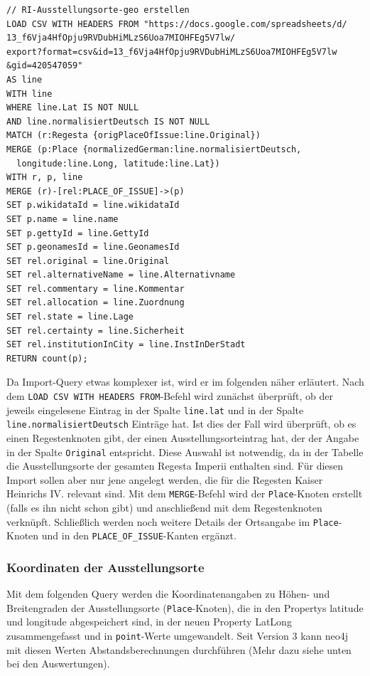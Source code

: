\begin{verbatim}
// RI-Ausstellungsorte-geo erstellen
LOAD CSV WITH HEADERS FROM "https://docs.google.com/spreadsheets/d/
13_f6Vja4HfOpju9RVDubHiMLzS6Uoa7MIOHFEg5V7lw/
export?format=csv&id=13_f6Vja4HfOpju9RVDubHiMLzS6Uoa7MIOHFEg5V7lw
&gid=420547059"
AS line
WITH line
WHERE line.Lat IS NOT NULL
AND line.normalisiertDeutsch IS NOT NULL
MATCH (r:Regesta {origPlaceOfIssue:line.Original})
MERGE (p:Place {normalizedGerman:line.normalisiertDeutsch,
  longitude:line.Long, latitude:line.Lat})
WITH r, p, line
MERGE (r)-[rel:PLACE_OF_ISSUE]->(p)
SET p.wikidataId = line.wikidataId
SET p.name = line.name
SET p.gettyId = line.GettyId
SET p.geonamesId = line.GeonamesId
SET rel.original = line.Original
SET rel.alternativeName = line.Alternativname
SET rel.commentary = line.Kommentar
SET rel.allocation = line.Zuordnung
SET rel.state = line.Lage
SET rel.certainty = line.Sicherheit
SET rel.institutionInCity = line.InstInDerStadt
RETURN count(p);
\end{verbatim}

Da Import-Query etwas komplexer ist, wird er im folgenden näher
erläutert. Nach dem \texttt{LOAD\ CSV\ WITH\ HEADERS\ FROM}-Befehl wird
zunächst überprüft, ob der jeweils eingelesene Eintrag in der Spalte
\texttt{line.lat} und in der Spalte \texttt{line.normalisiertDeutsch}
Einträge hat. Ist dies der Fall wird überprüft, ob es einen
Regestenknoten gibt, der einen Ausstellungsorteintrag hat, der der
Angabe in der Spalte \texttt{Original} entspricht. Diese Auswahl ist
notwendig, da in der Tabelle die Ausstellungsorte der gesamten Regesta
Imperii enthalten sind. Für diesen Import sollen aber nur jene angelegt
werden, die für die Regesten Kaiser Heinrichs IV. relevant sind. Mit dem
\texttt{MERGE}-Befehl wird der \texttt{Place}-Knoten erstellt (falls es
ihn nicht schon gibt) und anschließend mit dem Regestenknoten verknüpft.
Schließlich werden noch weitere Details der Ortsangabe im
\texttt{Place}-Knoten und in den \texttt{PLACE\_OF\_ISSUE}-Kanten
ergänzt.

\hypertarget{koordinaten-der-ausstellungsorte}{%
\subsubsection{Koordinaten der
Ausstellungsorte}\label{koordinaten-der-ausstellungsorte}}

Mit dem folgenden Query werden die Koordinatenangaben zu Höhen- und
Breitengraden der Ausstellungsorte (\texttt{Place}-Knoten), die in den
Propertys latitude und longitude abgespeichert sind, in der neuen
Property LatLong zusammengefasst und in \texttt{point}-Werte
umgewandelt. Seit Version 3 kann neo4j mit diesen Werten
Abstandsberechnungen durchführen (Mehr dazu siehe unten bei den
Auswertungen).

